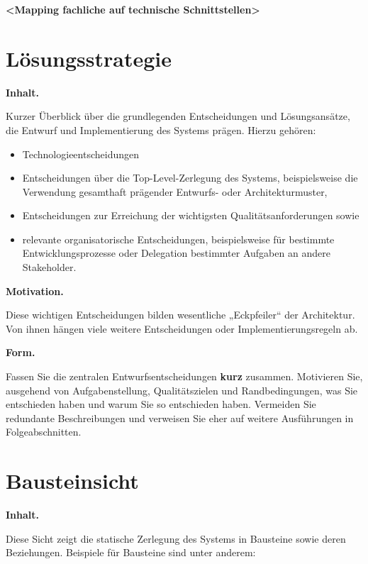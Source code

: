 \documentclass[]{article}
\begin{document}
\textbf{\textless{}Mapping fachliche auf technische
Schnittstellen\textgreater{}}

\hypertarget{section-solution-strategy}{%
\section{Lösungsstrategie}\label{section-solution-strategy}}

\textbf{Inhalt.}

Kurzer Überblick über die grundlegenden Entscheidungen und
Lösungsansätze, die Entwurf und Implementierung des Systems prägen.
Hierzu gehören:

\begin{itemize}
\item
  Technologieentscheidungen
\item
  Entscheidungen über die Top-Level-Zerlegung des Systems,
  beispielsweise die Verwendung gesamthaft prägender Entwurfs- oder
  Architekturmuster,
\item
  Entscheidungen zur Erreichung der wichtigsten Qualitätsanforderungen
  sowie
\item
  relevante organisatorische Entscheidungen, beispielsweise für
  bestimmte Entwicklungsprozesse oder Delegation bestimmter Aufgaben an
  andere Stakeholder.
\end{itemize}

\textbf{Motivation.}

Diese wichtigen Entscheidungen bilden wesentliche „Eckpfeiler`` der
Architektur. Von ihnen hängen viele weitere Entscheidungen oder
Implementierungsregeln ab.

\textbf{Form.}

Fassen Sie die zentralen Entwurfsentscheidungen \textbf{kurz} zusammen.
Motivieren Sie, ausgehend von Aufgabenstellung, Qualitätszielen und
Randbedingungen, was Sie entschieden haben und warum Sie so entschieden
haben. Vermeiden Sie redundante Beschreibungen und verweisen Sie eher
auf weitere Ausführungen in Folgeabschnitten.

\hypertarget{section-building-block-view}{%
\section{Bausteinsicht}\label{section-building-block-view}}

\textbf{Inhalt.}

Diese Sicht zeigt die statische Zerlegung des Systems in Bausteine sowie
deren Beziehungen. Beispiele für Bausteine sind unter anderem:
\end{document}

